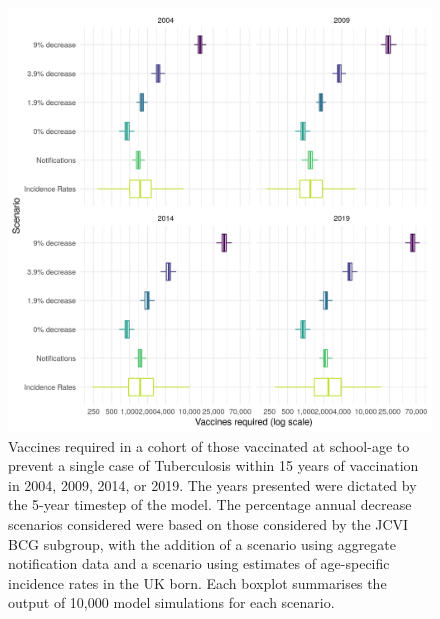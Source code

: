 \documentclass[11pt,twoside]{bristolthesis}
\begin{document}
  \newpage
  \begin{figure}
  
  {\centering \includegraphics[width=0.8\linewidth,]{chapters/evidence-policy-change/fig-2} 
  
  }
  
  \caption[Vaccines required in a cohort of those vaccinated at school-age to prevent a single case of Tuberculosis within 15 years of vaccination in 2004, 2009, 2014, or 2019.]{Vaccines required in a cohort of those vaccinated at school-age to prevent a single case of Tuberculosis within 15 years of vaccination in 2004, 2009, 2014, or 2019. The years presented were dictated by the 5-year timestep of the model. The percentage annual decrease scenarios considered were based on those considered by the JCVI BCG subgroup, with the addition of a scenario using aggregate notification data and a scenario using estimates of age-specific incidence rates in the UK born. Each boxplot summarises the output of 10,000 model simulations for each scenario.}\label{fig:graph-vacs-to-prev}
  \end{figure}
\end{document}
